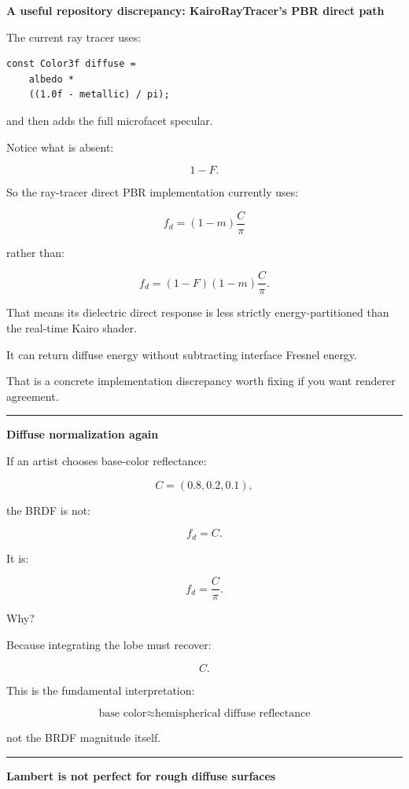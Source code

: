 \textbf{A useful repository discrepancy: KairoRayTracer's PBR direct path}

The current ray tracer uses:

\begin{verbatim}
const Color3f diffuse =
    albedo *
    ((1.0f - metallic) / pi);
\end{verbatim}

and then adds the full microfacet specular.

Notice what is absent:

\[
1-F.
\]

So the ray-tracer direct PBR implementation currently uses:

\[
f_d=
(1-m)\frac{C}{\pi}
\]

rather than:

\[
f_d=
(1-F)(1-m)\frac{C}{\pi}.
\]

That means its dielectric direct response is less strictly energy-partitioned than the real-time Kairo shader.

It can return diffuse energy without subtracting interface Fresnel energy.

That is a concrete implementation discrepancy worth fixing if you want renderer agreement.

\begin{center}\rule{0.5\linewidth}{0.5pt}\end{center}

\textbf{Diffuse normalization again}

If an artist chooses base-color reflectance:

\[
C=(0.8,0.2,0.1),
\]

the BRDF is not:

\[
f_d=C.
\]

It is:

\[
\boxed{
f_d=\frac{C}{\pi}.
}
\]

Why?

Because integrating the lobe must recover:

\[
C.
\]

This is the fundamental interpretation:

\[
\boxed{
\text{base color}
\approx
\text{hemispherical diffuse reflectance}
}
\]

not the BRDF magnitude itself.

\begin{center}\rule{0.5\linewidth}{0.5pt}\end{center}

\textbf{Lambert is not perfect for rough diffuse surfaces}

